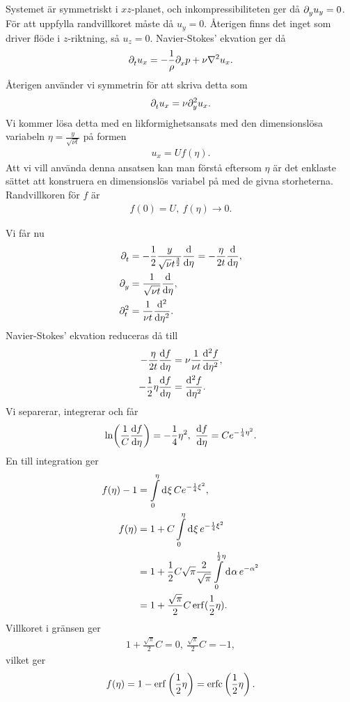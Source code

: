Systemet är symmetriskt i $xz$-planet, och inkompressibiliteten ger då $\del{y}{u_{y}} = 0$. För att uppfylla randvillkoret måste då $u_{y} = 0$. Återigen finns det inget som driver flöde i $z$-riktning, så $u_{z} = 0$. Navier-Stokes' ekvation ger då
\begin{align*}
	\del{t}{u_{x}} = -\frac{1}{\rho}\del{x}{p} + \nu\laplacian{u_{x}}.
\end{align*}
Återigen använder vi symmetrin för att skriva detta som
\begin{align*}
	\del{t}{u_{x}} = \nu\del[2]{y}{u_{x}}.
\end{align*}
Vi kommer lösa detta med en likformighetsansats med den dimensionslösa variabeln $\eta = \frac{y}{\sqrt{\nu t}}$ på formen
\begin{align*}
	u_{x} = Uf(\eta).
\end{align*}
Att vi vill använda denna ansatsen kan man förstå eftersom $\eta$ är det enklaste sättet att konstruera en dimensionslös variabel på med de givna storheterna. Randvillkoren för $f$ är
\begin{align*}
	f(0) = U,\ f(\eta) \to 0.
\end{align*}

Vi får nu
\begin{align*}
	\del{t}{}    &= -\frac{1}{2}\frac{y}{\sqrt{\nu}t^{\frac{3}{2}}}\dv{\eta} = -\frac{\eta}{2t}\dv{\eta}, \\
	\del{y}{}    &= \frac{1}{\sqrt{\nu t}}\dv{\eta}, \\
	\del[2]{t}{} &= \frac{1}{\nu t}\dv[2]{\eta}.
\end{align*}
Navier-Stokes' ekvation reduceras då till
\begin{align*}
	-\frac{\eta}{2t}\dv{f}{\eta} &= \nu\frac{1}{\nu t}\dv[2]{f}{\eta}, \\
	-\frac{1}{2}\eta\dv{f}{\eta} &= \dv[2]{f}{\eta}.
\end{align*}
Vi separerar, integrerar och får
\begin{align*}
	\ln(\frac{1}{C}\dv{f}{\eta}) = -\frac{1}{4}\eta^{2},\ \dv{f}{\eta} = Ce^{-\frac{1}{4}\eta^{2}}.
\end{align*}
En till integration ger
\begin{align*}
	f(\eta) - 1 &= \integ{0}{\eta}{\xi}{Ce^{-\frac{1}{4}\xi^{2}}}, \\
	f(\eta)     &= 1 + C\integ{0}{\eta}{\xi}{e^{-\frac{1}{4}\xi^{2}}} \\
	            &= 1 + \frac{1}{2}C\sqrt{\pi}\frac{2}{\sqrt{\pi}}\integ{0}{\frac{1}{2}\eta}{\alpha}{e^{-\alpha^{2}}} \\
	            &= 1 + \frac{\sqrt{\pi}}{2}C\erf(\frac{1}{2}\eta).
\end{align*}
Villkoret i gränsen ger
\begin{align*}
	1 + \frac{\sqrt{\pi}}{2}C = 0,\ \frac{\sqrt{\pi}}{2}C = -1,
\end{align*}
vilket ger
\begin{align*}
	f(\eta) = 1 - \erf\left(\frac{1}{2}\eta\right) = \erfc\left(\frac{1}{2}\eta\right).
\end{align*}